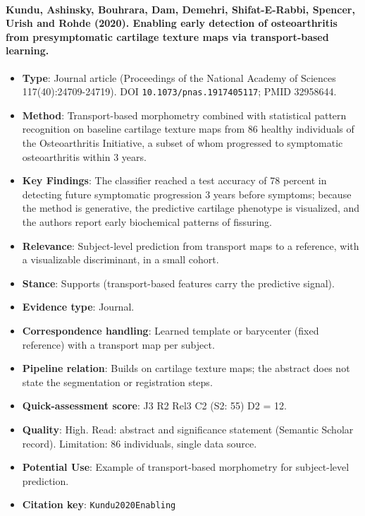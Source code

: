 \documentclass[journal,onecolumn]{IEEEtran}
\begin{document}
\paragraph{Kundu, Ashinsky, Bouhrara, Dam, Demehri, Shifat-E-Rabbi, Spencer, Urish and Rohde (2020). Enabling early detection of osteoarthritis from presymptomatic cartilage texture maps via transport-based learning.~\cite{Kundu2020Enabling}}\mbox{}

\begin{itemize}

\item{} \textbf{Type}: Journal article (Proceedings of the National Academy of Sciences 117(40):24709-24719). DOI \nolinkurl{10.1073/pnas.1917405117}; PMID 32958644.

\item{} \textbf{Method}: Transport-based morphometry combined with statistical pattern recognition on baseline cartilage texture maps from 86 healthy individuals of the Osteoarthritis Initiative, a subset of whom progressed to symptomatic osteoarthritis within 3 years.

\item{} \textbf{Key Findings}: The classifier reached a test accuracy of 78 percent in detecting future symptomatic progression 3 years before symptoms; because the method is generative, the predictive cartilage phenotype is visualized, and the authors report early biochemical patterns of fissuring.

\item{} \textbf{Relevance}: Subject-level prediction from transport maps to a reference, with a visualizable discriminant, in a small cohort.

\item{} \textbf{Stance}: Supports (transport-based features carry the predictive signal).

\item{} \textbf{Evidence type}: Journal.

\item{} \textbf{Correspondence handling}: Learned template or barycenter (fixed reference) with a transport map per subject.

\item{} \textbf{Pipeline relation}: Builds on cartilage texture maps; the abstract does not state the segmentation or registration steps.

\item{} \textbf{Quick-assessment score}: J3 R2 Rel3 C2 (S2: 55) D2 = 12.

\item{} \textbf{Quality}: High. Read: abstract and significance statement (Semantic Scholar record). Limitation: 86 individuals, single data source.

\item{} \textbf{Potential Use}: Example of transport-based morphometry for subject-level prediction.

\item{} \textbf{Citation key}: \texttt{Kundu2020Enabling}

\end{itemize}
\end{document}
